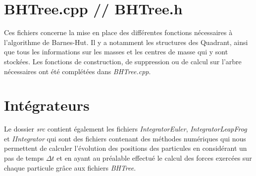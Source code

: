 \section{BHTree.cpp // BHTree.h}
Ces fichiers concerne la mise en place des différentes fonctions nécessaires à l'algorithme de Barnes-Hut. Il y a notamment les structures des Quadrant, ainsi que tous les informations sur les masses et les centres de masse qui y sont stockées. Les fonctions de construction, de suppression ou de calcul sur l'arbre nécessaires ont été complétées dans \textit{BHTree.cpp}.

\section{Intégrateurs}
Le dossier \textit{src} contient également les fichiers \textit{IntegratorEuler}, \textit{IntegratorLeapFrog} et \textit{IIntegrator} qui sont des fichiers contenant des méthodes numériques qui nous permettent de calculer l'évolution des positions des particules en considérant un pas de temps \textit{$\Delta t$} et en ayant au préalable effectué le calcul des forces exercées sur chaque particule grâce aux fichiers \textit{BHTree}.

